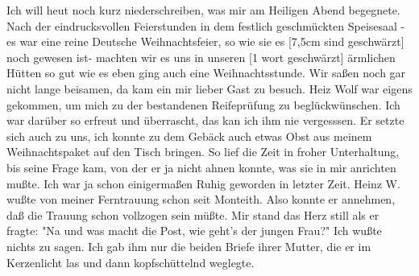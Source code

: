 \def\day{31. Dezember 1944.}
\mktitle

Ich will heut noch kurz niederschreiben, was mir am Heiligen Abend begegnete.
Nach der eindrucksvollen Feierstunden in dem festlich geschm\"{u}ckten Speisesaal - es war eine reine Deutsche Weihnachtsfeier, so wie sie es {\color{red} [7,5cm sind geschw\"{a}rzt] noch gewesen ist- machten wir es uns in unseren [1 wort geschw\"{a}rzt] } \"{a}rmlichen H\"{u}tten so gut wie es eben ging auch eine Weihnachtsstunde.
Wir sa{\ss}en noch gar nicht lange beisamen, da kam ein mir lieber Gast zu besuch.
Heiz Wolf war eigens gekommen, um mich zu der bestandenen Reifepr\"{u}fung zu begl\"{u}ckw\"{u}nschen.
Ich war dar\"{u}ber so erfreut und \"{u}berrascht, das kan ich ihm nie vergesssen.
Er setzte sich auch zu uns, ich konnte zu dem Geb\"{a}ck auch etwas Obst aus meinem Weihnachtspaket auf den Tisch bringen.
So lief die Zeit in froher Unterhaltung, bis seine Frage kam, von der er ja nicht ahnen konnte, was sie in mir anrichten mu{\ss}te.
Ich war ja schon einigerma{\ss}en Ruhig geworden in letzter Zeit.
Heinz W. wu{\ss}te von meiner Ferntrauung schon seit Monteith.
Also konnte er annehmen, da{\ss} die Trauung schon vollzogen sein m\"{u}{\ss}te.
Mir stand das Herz still als er fragte: "Na und was macht die Post, wie geht's der jungen Frau?"
Ich wu{\ss}te nichts zu sagen.
Ich gab ihm nur die beiden Briefe ihrer Mutter, die er im Kerzenlicht las und dann kopfsch\"{u}ttelnd weglegte.

\clearpage
